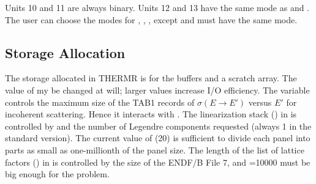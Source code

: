 Units 10 and 11 are always binary.  Units 12 and 13 have the same mode
as  and .  The user can choose the modes for
, , , except  and
 must have the same mode.

\subsection{Storage Allocation}
\label{ssTHERMR_storage}

The storage allocated in THERMR is for the 
buffers and a scratch array.   The value of  my be changed
at will; larger values increase I/O efficiency.  The variable 
controls the maximum size of the TAB1 records of $\sigma(E\rightarrow E')$
versus $E'$ for incoherent scattering.  Hence it interacts with .
The linearization stack () in  is controlled by
 and the number of Legendre components requested (always 1
in the standard version).  The current value of  (20) is
sufficient to divide each panel into parts as small as one-millionth
of the panel size.  The length of the list of lattice factors ()
in  is controlled by the size of the ENDF/B File 7, and
=10000 must be big enough for the problem.

\cleardoublepage

